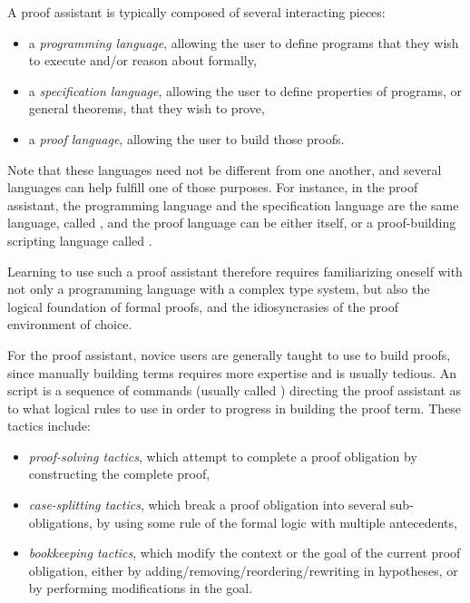 A proof assistant is typically composed of several interacting pieces:

\begin{itemize}

  \item a \emph{programming language}, allowing the user to define programs that
they wish to execute and/or reason about formally,

  \item a \emph{specification language}, allowing the user to define properties
of programs, or general theorems, that they wish to prove,

  \item a \emph{proof language}, allowing the user to build those proofs.

\end{itemize}

Note that these languages need not be different from one another, and several
languages can help fulfill one of those purposes.  For instance, in the \Coq{}
proof assistant, the programming language and the specification language are the
same language, called \Gallina{}, and the proof language can be either
\Gallina{} itself, or a proof-building scripting language called \Ltac{}.

Learning to use such a proof assistant therefore requires familiarizing oneself
with not only a programming language with a complex type system, but also the
logical foundation of formal proofs, and the idiosyncrasies of the proof
environment of choice.

For the \Coq{} proof assistant, novice users are generally taught to use \Ltac{}
to build proofs, since manually building \Gallina{} terms requires more
expertise and is usually tedious.  An \Ltac{} script is a sequence of commands
(usually called ) directing the proof assistant as to what
logical rules to use in order to progress in building the proof term.  These
tactics include:

\begin{itemize}

  \item \emph{proof-solving tactics}, which attempt to complete a proof
obligation by constructing the complete proof,

  \item \emph{case-splitting tactics}, which break a proof obligation into
several sub-obligations, by using some rule of the formal logic with multiple
antecedents,

  \item \emph{bookkeeping tactics}, which modify the context or the goal of the
current proof obligation, either by adding/removing/reordering/rewriting in
hypotheses, or by performing modifications in the goal.

\end{itemize}

